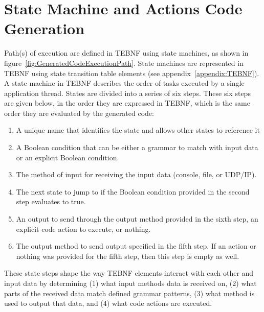 \section{State Machine and Actions Code Generation}
Path(s) of execution are defined in TEBNF using state machines, as shown in figure~\ref{fig:GeneratedCodeExecutionPath}.  State machines are represented in TEBNF using state transition table elements (see appendix~\ref{appendix:TEBNF}).  A state machine in TEBNF describes the order of tasks executed by a single application thread.  States are divided into a series of six steps.  These six steps are given below, in the order they are expressed in TEBNF, which is the same order they are evaluated by the generated code:
\begin{enumerate}
  \item A unique name that identifies the state and allows other states to reference it
  \item A Boolean condition that can be either a grammar to match with input data or an explicit Boolean condition.
  \item The method of input for receiving the input data (console, file, or UDP/IP).
  \item The next state to jump to if the Boolean condition provided in the second step evaluates to true.
  \item An output to send through the output method provided in the sixth step, an explicit code action to execute, or nothing.
  \item The output method to send output specified in the fifth step.  If an action or nothing was provided for the fifth step, then this step is empty as well.
\end{enumerate}

\indent
These state steps shape the way TEBNF elements interact with each other and input data by determining (1) what input methods data is received on, (2) what parts of the received data match defined grammar patterns, (3) what method is used to output that data, and (4) what code actions are executed.
